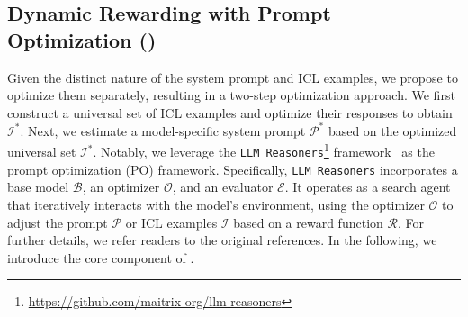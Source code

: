 




\subsection{Dynamic Rewarding with Prompt Optimization (\ours)}

Given the distinct nature of the system prompt and ICL examples, we propose to optimize them separately, resulting in a two-step optimization approach. We first construct a universal set of ICL examples and optimize their responses to obtain $\mathcal{I}^*$. Next, we estimate a model-specific system prompt $\mathcal{P}^*$ based on the optimized universal set $\mathcal{I}^*$. Notably, we leverage the \texttt{LLM Reasoners}\footnote{\url{https://github.com/maitrix-org/llm-reasoners}} framework~\cite{hao2023reasoning, hao2024llm} as the prompt optimization (PO) framework. Specifically, \texttt{LLM Reasoners} incorporates a base model $\mathcal{B}$, an optimizer $\mathcal{O}$, and an evaluator $\mathcal{E}$. It operates as a search agent that iteratively interacts with the model's environment, using the optimizer $\mathcal{O}$ to adjust the prompt $\mathcal{P}$ or ICL examples $\mathcal{I}$ based on a reward function $\mathcal{R}$. For further details, we refer readers to the original references. In the following, we introduce the core component of \ours. 


